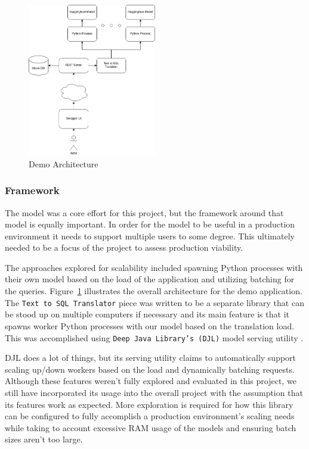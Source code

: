 \documentclass[11pt]{article}
\begin{document}
\begin{figure}
\centering
\includegraphics[width=0.5\textwidth]{demo-architecture.drawio.png}
\caption{\label{fig:architecture} Demo Architecture}
\end{figure}

\subsubsection{Framework}

The model was a core effort for this project, but the framework around that model is equally important. In order for the model to be useful in a production environment it needs to support multiple users to some degree. This ultimately needed to be a focus of the project to assess production viability.

The approaches explored for scalability included spawning Python processes with their own model based on the load of the application and utilizing batching for the queries. Figure~\ref{fig:architecture} illustrates the overall architecture for the demo application. The \texttt{Text to SQL Translator} piece was written to be a separate library that can be stood up on multiple computers if necessary and its main feature is that it spawns worker Python processes with our model based on the translation load. This was accomplished using \texttt{Deep Java Library's (DJL)} model serving utility \citep{djlserving}.

DJL does a lot of things, but its serving utility claims to automatically support scaling up/down workers based on the load and dynamically batching requests. Although these features weren't fully explored and evaluated in this project, we still have incorporated its usage into the overall project with the assumption that its features work as expected. More exploration is required for how this library can be configured to fully accomplish a production environment's scaling needs while taking to account excessive RAM usage of the models and ensuring batch sizes aren't too large.
\end{document}
